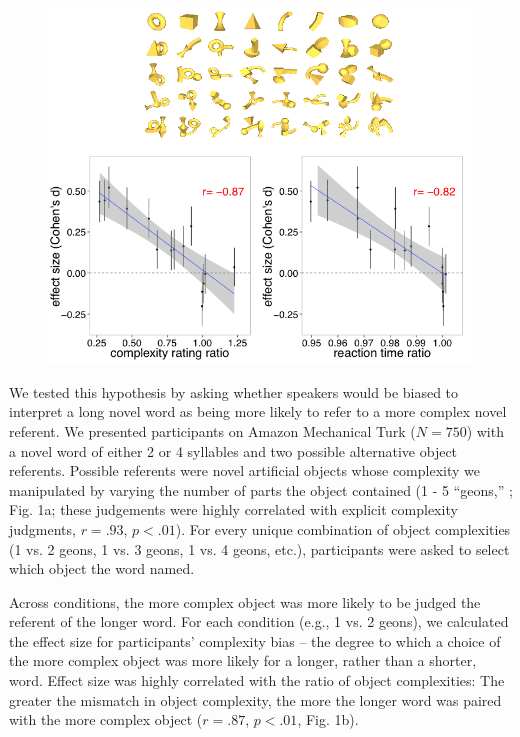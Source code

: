 \documentclass[12pt]{article}
\begin{document}
\begin{figure}[t]
\begin{center}
\includegraphics[scale = .5]{figs/geons_cropped.png}
\caption{}
\end{center}
\label{fig:geons}
\end{figure}


We tested this hypothesis by asking whether speakers would be biased to interpret a long novel word as being more likely to refer to a more complex novel referent. We presented participants on Amazon Mechanical Turk ($N=750$) with a novel word of either 2 or 4 syllables and two possible alternative object referents. Possible referents were novel artificial objects whose complexity we manipulated by varying the number of parts the object contained (1 - 5 ``geons,'' \cite{biederman1987}; Fig. 1a; these judgements were highly correlated with explicit complexity judgments, $r = .93$, $p < .01$). For every unique combination of object complexities (1 vs. 2 geons, 1 vs. 3 geons, 1 vs. 4 geons, etc.), participants were asked to select which object the word named. 

Across conditions, the more complex object was more likely to be judged the referent of the longer word. For each condition (e.g., 1 vs. 2 geons), we calculated the effect size for participants' complexity bias – the degree to which a choice of the more complex object was more likely for a longer, rather than a shorter, word.  Effect size was highly correlated with the ratio of object complexities: The greater the mismatch in object complexity, the more the longer word was paired with the more complex object ($r = .87$, $p < .01$, Fig. 1b).
					
\end{document}
